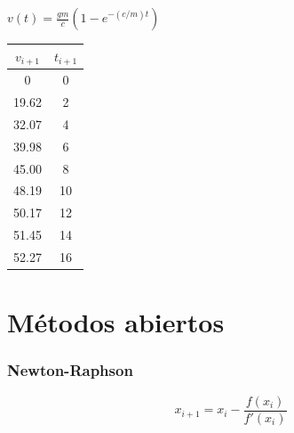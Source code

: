 \documentclass[letterpaper,12pt]{article}
\begin{document}
\begin{sloppypar}
$\displaystyle v(t)  = \frac{gm}{c} (1 - e^{-(c/m)t})$

\begin{center}
    \begin{tabular}[H]{|c|c|}\hline 
        $v_{i+1}$ & $t_{i+1}$ \\ \hline
        0 & 0 \\ \hline
        19.62 & 2 \\ \hline
        32.07 & 4 \\ \hline
        39.98 & 6 \\ \hline
        45.00 & 8 \\ \hline
        48.19 & 10 \\ \hline
        50.17 & 12  \\ \hline
        51.45 & 14 \\ \hline
        52.27 & 16 \\ \hline
    \end{tabular} 
\end{center}
\section*{Métodos abiertos}
\subsubsection*{Newton-Raphson}

$$x_{i+1} = x_i - \frac{f(x_i)}{f\prime (x_i)}$$


\end{sloppypar}
\end{document}
